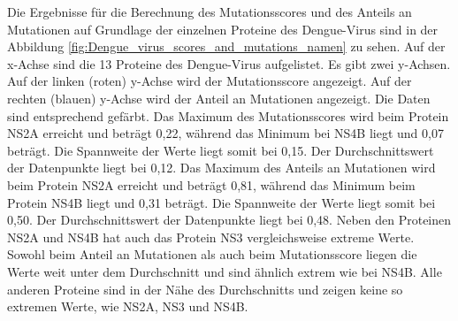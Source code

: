 \documentclass[german,version-2022-01]{uzl-thesis}
\begin{document}
Die Ergebnisse f\"ur die Berechnung des Mutationsscores und des Anteils an Mutationen auf Grundlage der einzelnen Proteine des Dengue-Virus sind in der Abbildung \ref{fig:Dengue_virus_scores_and_mutations_namen} zu sehen. Auf der x-Achse sind die 13 Proteine des Dengue-Virus aufgelistet. Es gibt zwei y-Achsen. Auf der linken (roten) y-Achse wird der Mutationsscore angezeigt. Auf der rechten (blauen) y-Achse wird der Anteil an Mutationen angezeigt. Die Daten sind entsprechend gef\"arbt. Das Maximum des Mutationsscores wird beim Protein NS2A erreicht und betr\"agt 0,22, w\"ahrend das Minimum bei NS4B liegt und 0,07 betr\"agt. Die Spannweite der Werte liegt somit bei 0,15. Der Durchschnittswert der Datenpunkte liegt bei 0,12. Das Maximum des Anteils an Mutationen wird beim Protein NS2A erreicht und betr\"agt 0,81, w\"ahrend das Minimum beim Protein NS4B liegt und 0,31 betr\"agt. Die Spannweite der Werte liegt somit bei 0,50. Der Durchschnittswert der Datenpunkte liegt bei 0,48. Neben den Proteinen NS2A und NS4B hat auch das Protein NS3 vergleichsweise extreme Werte. Sowohl beim Anteil an Mutationen als auch beim Mutationsscore liegen die Werte weit unter dem Durchschnitt und sind \"ahnlich extrem wie bei NS4B. Alle anderen Proteine sind in der N\"ahe des Durchschnitts und zeigen keine so extremen Werte, wie NS2A, NS3 und NS4B. 
\end{document}
